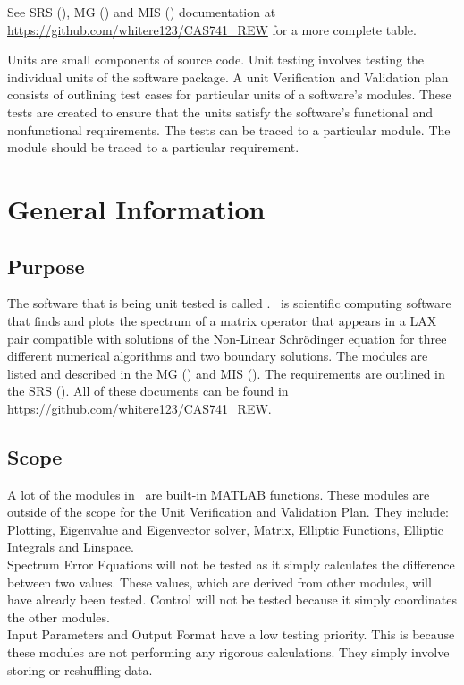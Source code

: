 \documentclass[12pt, titlepage]{article}
\begin{document}
See SRS (\cite{SRS}), MG (\cite{MG}) and MIS (\cite{MIS}) documentation at 
\url{https://github.com/whitere123/CAS741_REW} for a more complete table. 

\newpage


Units are small components of source code. Unit testing involves testing 
the individual units of the software package.  A unit Verification and 
Validation plan consists of outlining test cases for particular units of a 
software's modules. These tests are created to ensure that the units satisfy 
the software's functional and nonfunctional requirements. The tests can be 
traced to a particular module. The module should be traced to a particular 
requirement. 

\section{General Information}

\subsection{Purpose}

The software that is being unit tested is called \progname. \progname \ is 
scientific computing software that finds and plots the spectrum of a matrix 
operator that appears in a LAX pair compatible with solutions of the Non-Linear 
Schr\"{o}dinger equation for three different numerical algorithms and two 
boundary solutions. The modules are listed and described in the MG (\cite{MG}) 
and 
MIS (\cite{MIS}). The requirements are outlined in the SRS (\cite{SRS}). All of 
these documents can be 
found in \url{https://github.com/whitere123/CAS741_REW}. 

\subsection{Scope}

A lot of the modules in \progname \ are built-in MATLAB functions. These 
modules 
are outside of the scope for the Unit Verification and Validation Plan. They 
include: Plotting, Eigenvalue and Eigenvector solver, Matrix, Elliptic 
Functions, Elliptic Integrals and Linspace.\\ 
Spectrum Error Equations will not 
be tested as it simply calculates the difference between two values. These 
values, which are derived from other modules, will have already been tested. 
Control will not be tested because it simply coordinates the other modules.\\
Input Parameters and Output Format have a low testing priority. This is because 
these modules are not performing any rigorous calculations. They simply involve 
storing or reshuffling data. \\ 
\end{document}
